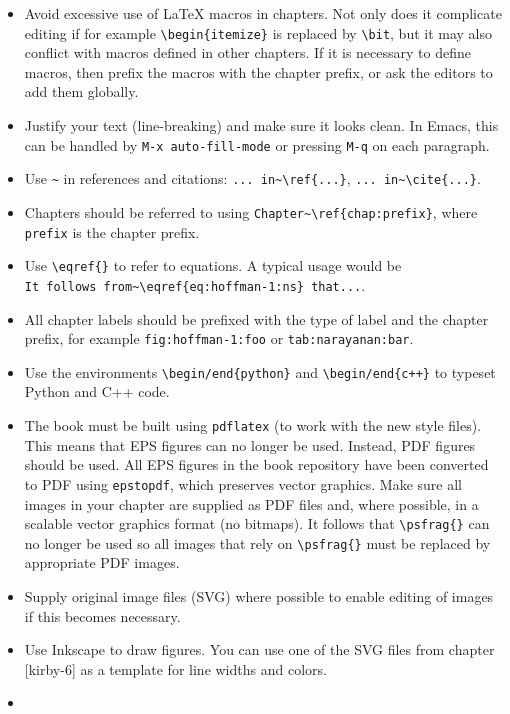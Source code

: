 \documentclass{article}
\begin{document}
\begin{itemize}
\item
  Avoid excessive use of \LaTeX{} macros in chapters. Not only does it
  complicate editing if for example \verb|\begin{itemize}| is replaced
  by \verb|\bit|, but it may also conflict with macros defined in
  other chapters. If it is necessary to define macros, then prefix the
  macros with the chapter prefix, or ask the editors to add them
  globally.
\item
  Justify your text (line-breaking) and make sure it looks clean. In
  Emacs, this can be handled by \verb|M-x auto-fill-mode| or pressing
  \verb|M-q| on each paragraph.
\item
  Use \verb|~| in references and citations: \verb|... in~\ref{...}|,
  \verb|... in~\cite{...}|.
\item
  Chapters should be referred to using \verb|Chapter~\ref{chap:prefix}|,
  where \verb|prefix| is the chapter prefix.
\item
  Use \verb|\eqref{}| to refer to equations. A typical usage would be \\
  \verb|It follows from~\eqref{eq:hoffman-1:ns} that...|.
\item
  All chapter labels should be prefixed with the type of label and the
  chapter prefix, for example \verb|fig:hoffman-1:foo| or
  \verb|tab:narayanan:bar|.
\item
  Use the environments \verb|\begin/end{python}| and
  \verb|\begin/end{c++}| to typeset Python and C++ code.
\item
  The book must be built using \verb|pdflatex| (to work with the new
  style files). This means that EPS figures can no longer be
  used. Instead, PDF figures should be used. All EPS figures in the
  book repository have been converted to PDF using \verb|epstopdf|,
  which preserves vector graphics. Make sure all images in your
  chapter are supplied as PDF files and, where possible, in a scalable
  vector graphics format (no bitmaps). It follows that
  \verb|\psfrag{}| can no longer be used so all images that rely on
  \verb|\psfrag{}| must be replaced by appropriate PDF images.
\item
  Supply original image files (SVG) where possible to enable editing
  of images if this becomes necessary.
\item
  Use Inkscape to draw figures. You can use one of the SVG files from
  chapter [kirby-6] as a template for line widths and colors.
\item

\end{itemize}
\end{document}
